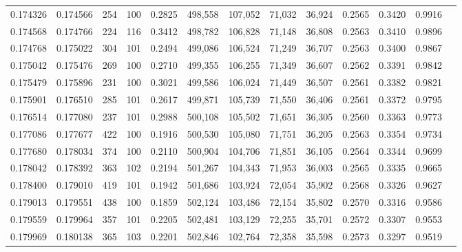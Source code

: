 \begin{tabular}{rrrrrrrrrrrrr}
0.174326 & 0.174566 &   254 & 100 &                                     0.2825 & 498,558 & 107,052 &  71,032 &  36,924 & 0.2565 & 0.3420 & 0.9916 \\
0.174568 & 0.174766 &   224 & 116 &                                     0.3412 & 498,782 & 106,828 &  71,148 &  36,808 & 0.2563 & 0.3410 & 0.9896 \\
0.174768 & 0.175022 &   304 & 101 &                                     0.2494 & 499,086 & 106,524 &  71,249 &  36,707 & 0.2563 & 0.3400 & 0.9867 \\
0.175042 & 0.175476 &   269 & 100 &                                     0.2710 & 499,355 & 106,255 &  71,349 &  36,607 & 0.2562 & 0.3391 & 0.9842 \\
0.175479 & 0.175896 &   231 & 100 &                                     0.3021 & 499,586 & 106,024 &  71,449 &  36,507 & 0.2561 & 0.3382 & 0.9821 \\
0.175901 & 0.176510 &   285 & 101 &                                     0.2617 & 499,871 & 105,739 &  71,550 &  36,406 & 0.2561 & 0.3372 & 0.9795 \\
0.176514 & 0.177080 &   237 & 101 &                                     0.2988 & 500,108 & 105,502 &  71,651 &  36,305 & 0.2560 & 0.3363 & 0.9773 \\
0.177086 & 0.177677 &   422 & 100 &                                     0.1916 & 500,530 & 105,080 &  71,751 &  36,205 & 0.2563 & 0.3354 & 0.9734 \\
0.177680 & 0.178034 &   374 & 100 &                                     0.2110 & 500,904 & 104,706 &  71,851 &  36,105 & 0.2564 & 0.3344 & 0.9699 \\
0.178042 & 0.178392 &   363 & 102 &                                     0.2194 & 501,267 & 104,343 &  71,953 &  36,003 & 0.2565 & 0.3335 & 0.9665 \\
0.178400 & 0.179010 &   419 & 101 &                                     0.1942 & 501,686 & 103,924 &  72,054 &  35,902 & 0.2568 & 0.3326 & 0.9627 \\
0.179013 & 0.179551 &   438 & 100 &                                     0.1859 & 502,124 & 103,486 &  72,154 &  35,802 & 0.2570 & 0.3316 & 0.9586 \\
0.179559 & 0.179964 &   357 & 101 &                                     0.2205 & 502,481 & 103,129 &  72,255 &  35,701 & 0.2572 & 0.3307 & 0.9553 \\
0.179969 & 0.180138 &   365 & 103 &                                     0.2201 & 502,846 & 102,764 &  72,358 &  35,598 & 0.2573 & 0.3297 & 0.9519 \\

\end{tabular}
